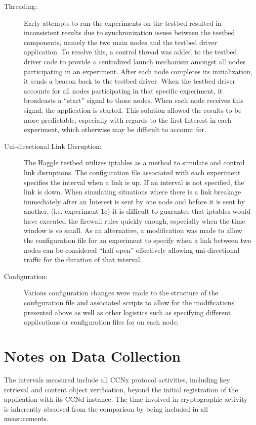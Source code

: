 \documentclass[a4paper,12pt]{report}      %
\begin{document}
\begin{description}
\item[Threading:] Early attempts to run the experiments on the testbed resulted in inconsistent results due to
synchronization issues between the testbed components, namely the two main nodes and the testbed
driver application. To resolve this, a control thread was added to the testbed driver code to provide a centralized launch
mechanism amongst all nodes participating in an experiment. After each node completes its
initialization, it sends a beacon back to the testbed driver. When the testbed driver accounts for all nodes participating 
in that specific experiment, it broadcasts a “start” signal to those nodes. When each node receives this signal, 
the application is started. This solution allowed the results to be more predictable, especially with regards to the first Interest in each experiment, which otherwise may be difficult to account for.

\item[Uni-directional Link Disruption:] The Haggle testbed utilizes iptables as a method to simulate and
control link disruptions. The configuration file associated with each experiment specifies the interval
when a link is up. If an interval is not specified, the link is down. When simulating situations where there is a link breakage immediately after an Interest is sent by one node and before it is sent by another, (i.e. experiment 1c) it is difficult to guarantee that iptables would have executed the firewall rules quickly enough, especially when the time window is so small. As an
alternative, a modification was made to allow the configuration file for an experiment to specify when
a link between two nodes can be considered “half open” effectively allowing uni-directional traffic for
the duration of that interval.

\item[Configuration:] Various configuration changes were made to the structure of the configuration file and
associated scripts to allow for the modifications presented above as well as other logistics such as
specifying different applications or configuration files for on each node.
\end{description}

\section{Notes on Data Collection}
The intervals measured include all CCNx protocol activities, including key retrieval and content object
verification, beyond the initial registration of the application with its CCNd instance. The time
involved in cryptographic activity is inherently absolved from the comparison by being included in all
measurements.
\end{document}
